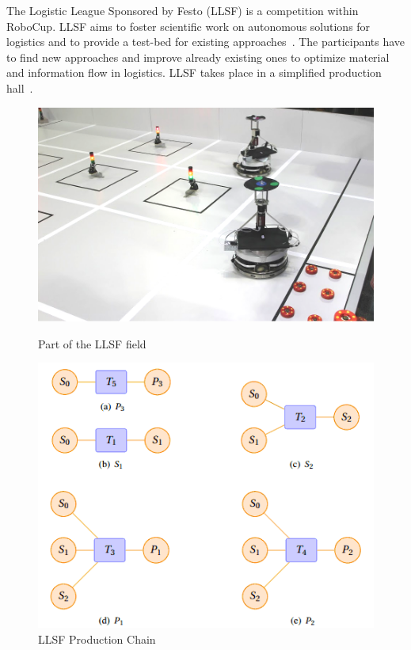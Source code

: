 \label{sec:llsf}
The Logistic League Sponsored by Festo (LLSF) is a competition within RoboCup. LLSF aims to foster scientific work on autonomous solutions for logistics and to provide a test-bed for existing approaches~\cite{LLSFTestbed}. The participants have to find new approaches and improve already existing ones to optimize material and information flow in logistics.
LLSF takes place  in a simplified production hall~\cite{LLSFRules}.
\begin{figure}
\begin{minipage}[b]{0.5\linewidth}
\includegraphics[scale=0.23]{pics/llsf}
\caption{Part of the LLSF field}
\label{fig:llsf_field}
\end{minipage}
\quad
\begin{minipage}[b]{0.5\linewidth}
\includegraphics[scale=0.45]{pics/production_chain}
\caption[LLSF Production Chain]{LLSF Production Chain~\cite{LLSFRules}}
\label{fig:llsf_chain}
\end{minipage}
\end{figure}
